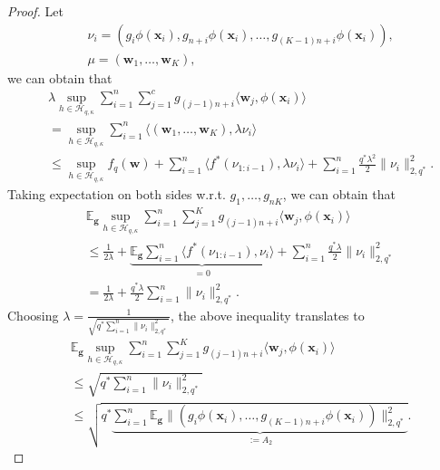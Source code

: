 \documentclass{article}
\begin{document}
\begin{proof}
  Let
  \begin{align*}
    &\nu_i= (g_i\phi(\mathbf x_i),g_{n+i}\phi(\mathbf x_i),\ldots, g_{(K-1)n+i}\phi(\mathbf x_i)),\\
    &\mu=(\mathbf w_1,\ldots,\mathbf w_K),
  \end{align*}
  we can  obtain that
  \begin{align*}
    &\lambda\sup_{h\in \mathcal{H}_{q,\kappa}}\sum_{i=1}^n\sum_{j=1}^cg_{(j-1)n+i}\langle \mathbf w_j, \phi(\mathbf x_i)\rangle\\
    &=\sup_{h\in\mathcal{H}_{q,\kappa}}\sum_{i=1}^n\langle(\mathbf w_1,\ldots,\mathbf w_K),\lambda\nu_i\rangle\\
    &\leq \sup_{h\in\mathcal{H}_{q,\kappa}} f_q(\mathbf w)+\sum_{i=1}^n\langle f^\ast(\nu_{1:i-1}),\lambda\nu_i\rangle+\sum_{i=1}^n\frac{q^\ast\lambda^2}{2}\|\nu_i\|_{2,q^\ast}^2.
  \end{align*}
  Taking expectation on both sides w.r.t. $g_1,\ldots,g_{nK}$,
  we can obtain that
  \begin{align*}
    &\mathbb{E}_{\bm g}\sup_{h\in\mathcal{H}_{q,\kappa}}\sum_{i=1}^n\sum_{j=1}^Kg_{(j-1)n+i}\langle \mathbf w_j, \phi(\mathbf x_i)\rangle\\
    \nonumber
    &\leq\frac{1}{2\lambda}+\underbrace{\mathbb{E}_{\bm g}\sum_{i=1}^n\langle f^\ast(\nu_{1:i-1}),\nu_i\rangle}_{=0}+
    \sum_{i=1}^n\frac{q^\ast\lambda}{2}\|\nu_i\|_{2,q^\ast}^2\\
    &=\frac{1}{2\lambda}+\frac{q^\ast\lambda}{2}\sum_{i=1}^n\|\nu_i\|_{2,q^\ast}^2.
  \end{align*}
  Choosing  $\lambda=\frac{1}{\sqrt{q^\ast\sum_{i=1}^n\|\nu_i\|_{2,q^\ast}^2}}$,
  the above inequality translates to
  \begin{align}
   \label{eq-mid-he}
  \nonumber
    &\mathbb{E}_{\bm g}\sup_{h\in\mathcal{H}_{q,\kappa}}\sum_{i=1}^n\sum_{j=1}^Kg_{(j-1)n+i}\langle \mathbf w_j, \phi(\mathbf x_i)\rangle\\
    \nonumber
    &\leq \sqrt{q^\ast\sum_{i=1}^n\|\nu_i\|_{2,q^\ast}^2}\\
    &\leq \sqrt{q^\ast\underbrace{\sum_{i=1}^n\mathbb{E}_{\bm g}\|(g_i\phi(\mathbf x_i),\ldots, g_{(K-1)n+i}\phi(\mathbf x_i))\|_{2,q^\ast}^2}_{:=A_2}}.
  \end{align}

\end{proof}
\end{document}
